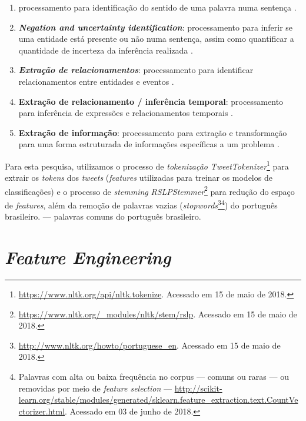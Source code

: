 \documentclass[
	12pt,				%
	oneside,			%
	a4paper,			%
	english,			%
	brazil				%
	]{abntex2ppgsi}
\begin{document}
\begin{enumerate}
\begin{enumerate}
\item{} processamento para identificação do sentido de uma palavra numa sentença \cite{nadkarni2011natural}. 
\item \textbf{\textit{Negation and uncertainty identification}}: processamento para inferir se uma entidade está presente ou não numa sentença, assim como quantificar a quantidade de incerteza da inferência realizada \cite{nadkarni2011natural}.
\item \textbf{\textit{Extração de relacionamentos}}: processamento para identificar relacionamentos entre entidades e eventos \cite{nadkarni2011natural}.
\item \textbf{Extração de relacionamento / inferência temporal}: processamento para inferência de expressões e relacionamentos temporais \cite{nadkarni2011natural}.
\item \textbf{Extração de informação}: processamento para extração e transformação para uma forma estruturada de informações específicas a um problema \cite{nadkarni2011natural}.
\end{enumerate}
\end{enumerate}

Para esta pesquisa, utilizamos o processo de \textit{tokenização} \textit{TweetTokenizer}\footnote {\url{https://www.nltk.org/api/nltk.tokenize}. Acessado em 15 de maio de 2018.} para extrair os \textit{tokens} dos \textit{tweets} (\textit{features} utilizadas para treinar os modelos de classificações) e o processo de \textit{stemming} \textit {RSLPStemmer}\footnote{\url{https://www.nltk.org/\_modules/nltk/stem/rslp}. Acessado em 15 de maio de 2018.} para redução do espaço de \textit{features}, além da remoção de palavras vazias (\textit{stopwords}\footnote{\url{http://www.nltk.org/howto/portuguese\_en}. Acessado em 15 de maio de 2018.}\footnote{Palavras com alta ou baixa frequência no corpus --- comuns ou raras --- ou removidas por meio de \textit{feature selection} --- \url{http://scikit-learn.org/stable/modules/generated/sklearn.feature_extraction.text.CountVectorizer.html}. Acessado em 03 de junho de 2018.}) do português brasileiro.  --- palavras comuns do português brasileiro.

\section{\textit{Feature Engineering}}
\label{featuresEng}
\end{document}
